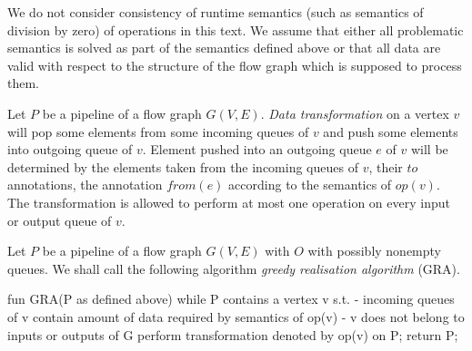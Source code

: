   We do not consider consistency of runtime semantics (such as semantics of division by zero) of operations in this text. We assume that either all problematic semantics is solved as part of the semantics defined above or that all data are valid with respect to the structure of the flow graph which is supposed to process them.


  Let $P$ be a pipeline of a flow graph $G(V,E)$. \emph{Data transformation} on a vertex $v$ will pop some elements from some incoming queues of $v$ and push some elements into outgoing queue of $v$. Element pushed into an outgoing queue $e$ of $v$ will be determined by the elements taken from the incoming queues of $v$, their $to$ annotations, the annotation $from(e)$ according to the semantics of $op(v)$. The transformation is allowed to perform at most one operation on every input or output queue of $v$.
\myenddef


  Let $P$ be a pipeline of a flow graph $G(V,E)$ with $O$ with possibly nonempty queues. We shall call the following algorithm \emph{greedy realisation algorithm} (GRA).
  \begin{code}
fun GRA(P as defined above)
{
  while P contains a vertex v s.t. 
    - incoming queues of v contain amount of data 
               required by semantics of op(v) 
    - v does not belong to inputs or outputs of G
  {
    perform transformation denoted by op(v) on P;
  }
  return P;  
}
  \end{code}
\myendalg


